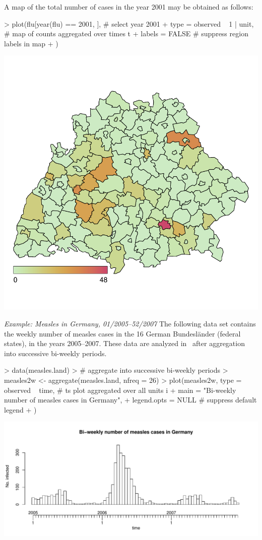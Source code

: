 \documentclass[a4paper,11pt]{article}
\newcommand{\example}[1]{\textit{Example: #1}}
\begin{document}
A map of the total number of cases in the year 2001 may be obtained as follows:
\begin{Schunk}
\begin{Sinput}
> plot(flu[year(flu) == 2001, ],    # select year 2001
+      type = observed ~ 1 | unit,  # map of counts aggregated over times t
+      labels = FALSE               # suppress region labels in map
+      )
\end{Sinput}
\end{Schunk}
\begin{center}
\vspace*{-2em}\includegraphics[width=.5\textwidth]{figs/vignette_hhh4-flu-ByBw}
\end{center}

\example{Measles in Germany, 01/2005--52/2007}
The following data set contains the weekly number of measles cases in the 16
German Bundesl\"ander (federal states), in the years 2005--2007. These data 
are analyzed in~\cite{herzog-etal-2010} after aggregation into successive 
bi-weekly periods.

\begin{Schunk}
\begin{Sinput}
> data(measles.land)
> # aggregate into successive bi-weekly periods
> measles2w <- aggregate(measles.land, nfreq = 26)
> plot(measles2w, type = observed ~ time,   # ts plot aggregated over all units i
+                 main = "Bi-weekly number of measles cases in Germany", 
+                 legend.opts = NULL        # suppress default legend
+                 )
\end{Sinput}
\end{Schunk}
\includegraphics{figs/vignette_hhh4-measles}
\end{document}
